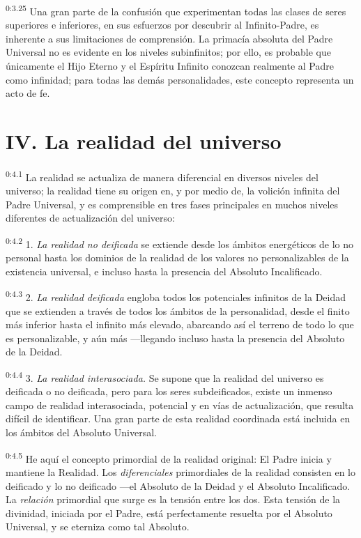 \par
\textsuperscript{0:3.25} Una gran parte de la confusión que experimentan todas las clases de seres superiores e inferiores, en sus esfuerzos por descubrir al Infinito-Padre, es inherente a sus limitaciones de comprensión. La primacía absoluta del Padre Universal no es evidente en los niveles subinfinitos; por ello, es probable que únicamente el Hijo Eterno y el Espíritu Infinito conozcan realmente al Padre como infinidad; para todas las demás personalidades, este concepto representa un acto de fe.

\section*{IV. La realidad del universo}
\par
\textsuperscript{0:4.1} La realidad se actualiza de manera diferencial en diversos niveles del universo; la realidad tiene su origen en, y por medio de, la volición infinita del Padre Universal, y es comprensible en tres fases principales en muchos niveles diferentes de actualización del universo:

\par
\textsuperscript{0:4.2} 1. \textit{La realidad no deificada} se extiende desde los ámbitos energéticos de lo no personal hasta los dominios de la realidad de los valores no personalizables de la existencia universal, e incluso hasta la presencia del Absoluto Incalificado.

\par
\textsuperscript{0:4.3} 2. \textit{La realidad deificada} engloba todos los potenciales infinitos de la Deidad que se extienden a través de todos los ámbitos de la personalidad, desde el finito más inferior hasta el infinito más elevado, abarcando así el terreno de todo lo que es personalizable, y aún más ---llegando incluso hasta la presencia del Absoluto de la Deidad.

\par
\textsuperscript{0:4.4} 3. \textit{La realidad interasociada.} Se supone que la realidad del universo es deificada o no deificada, pero para los seres subdeificados, existe un inmenso campo de realidad interasociada, potencial y en vías de actualización, que resulta difícil de identificar. Una gran parte de esta realidad coordinada está incluida en los ámbitos del Absoluto Universal.

\par
\textsuperscript{0:4.5} He aquí el concepto primordial de la realidad original: El Padre inicia y mantiene la Realidad. Los \textit{diferenciales} primordiales de la realidad consisten en lo deificado y lo no deificado ---el Absoluto de la Deidad y el Absoluto Incalificado. La \textit{relación} primordial que surge es la tensión entre los dos. Esta tensión de la divinidad, iniciada por el Padre, está perfectamente resuelta por el Absoluto Universal, y se eterniza como tal Absoluto.

